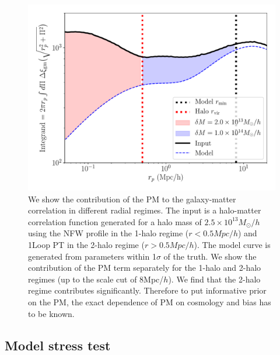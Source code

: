 \documentclass[fleqn,usenatbib]{mnras}
\begin{document}
\begin{figure}
\includegraphics[width=\columnwidth]{figs/PM_contribution_radial.pdf}
\caption[]{We show the contribution of the PM to the galaxy-matter correlation in different radial regimes. The input is a halo-matter correlation function generated for a halo mass of $2.5 \times 10^{13} M_{\odot}/h$ using the NFW profile in the 1-halo regime ($r < 0.5 Mpc/h$) and 1Loop PT in the 2-halo regime ($r > 0.5 Mpc/h$). The model curve is generated from parameters within 1$\sigma$ of the truth. We show the contribution of the PM term separately for the 1-halo  and 2-halo regimes (up to the scale cut of 8Mpc/$h$). We find that the 2-halo regime contributes significantly. Therefore to put informative prior on the PM, the exact dependence of PM on cosmology and bias has to be known. 
}
\label{fig:pm_prior}
\end{figure}




\subsection{Model stress test}
\end{document}
